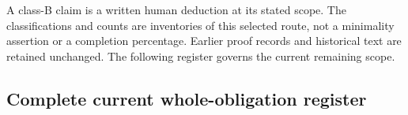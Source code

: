 A class-B claim is a written human deduction at its stated scope.
The classifications and counts are inventories of this selected route,
not a minimality assertion or a completion percentage. Earlier proof
records and historical text are retained unchanged. The following
register governs the current remaining scope.

\subsection{Complete current whole-obligation register}


